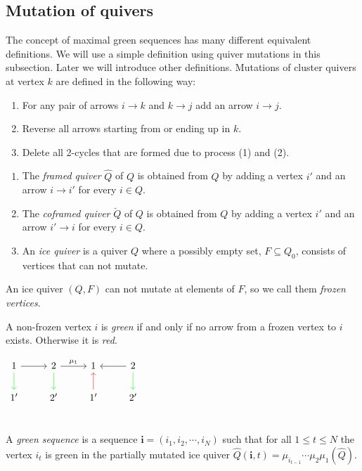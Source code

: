 \subsection{Mutation of quivers}
\indent The concept of maximal green sequences has many different equivalent definitions. We will use a simple definition using quiver mutations in this subsection. Later we will introduce other definitions. Mutations of cluster quivers at vertex $k$ are defined in the following way:
\begin{enumerate}
\item For any pair of arrows $i\to k$ and $k\to j$ add an arrow $i\to j$.
\item Reverse all arrows starting from or ending up in $k$.
\item Delete all 2-cycles that are formed due to process (1) and (2).
\end{enumerate}
\begin{definition}
\begin{enumerate}
\item The \textit{framed quiver} $\hat{Q}$ of $Q$ is obtained from $Q$ by adding a vertex $i'$ and an arrow $i\rightarrow i'$ for every $i\in Q$.
\item The \textit{coframed quiver} $\breve{Q}$ of $Q$ is obtained from $Q$ by adding a vertex $i'$ and an arrow $i'\rightarrow i$ for every $i\in Q$.
\item An \textit{ice quiver} is a quiver $Q$ where a possibly empty set, $F\subseteq Q_0$, consists of vertices that can not mutate.
\end{enumerate}
\end{definition}
\indent An ice quiver $(Q,F)$ can not mutate at elements of $F$, so we call them \textit{frozen vertices}.
\begin{definition}
A non-frozen vertex $i$ is \textit{green} if and only if no arrow from a frozen vertex to $i$ exists. Otherwise it is \textit{red}.\cite{Kel11}
\end{definition}
$\begin{tikzcd}
1 \arrow[r] \arrow[green]{d} & 2\arrow[green]{d}\arrow[r,"\mu_1"]  & 1&2\arrow[l]\arrow[green]{d}\\
1' & 2'&1'\arrow[red]{u}& 2'\\
\end{tikzcd}$
\begin{definition}
A \textit{green sequence} is a sequence $\mathbf{i}=(i_1, i_2,\cdots, i_N)$ such that for all $1\leq t\leq N$ the vertex $i_t$ is green in the partially mutated ice quiver $\hat{Q}(\mathbf{i},t)=\mu_{i_{t-1}}\cdots\mu_2\mu_1(\hat{Q})$.
\end{definition}
